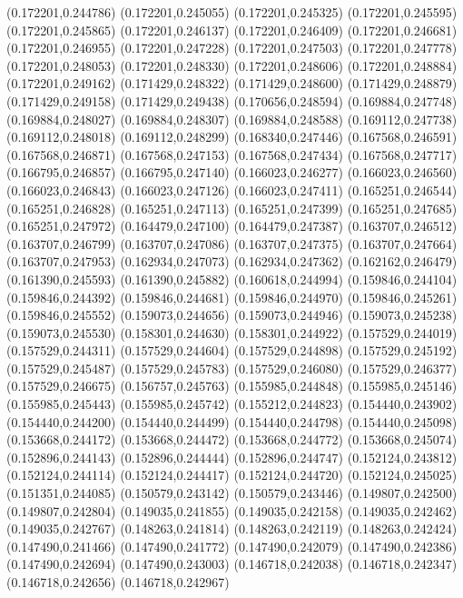 (0.172201,0.244786)
(0.172201,0.245055)
(0.172201,0.245325)
(0.172201,0.245595)
(0.172201,0.245865)
(0.172201,0.246137)
(0.172201,0.246409)
(0.172201,0.246681)
(0.172201,0.246955)
(0.172201,0.247228)
(0.172201,0.247503)
(0.172201,0.247778)
(0.172201,0.248053)
(0.172201,0.248330)
(0.172201,0.248606)
(0.172201,0.248884)
(0.172201,0.249162)
(0.171429,0.248322)
(0.171429,0.248600)
(0.171429,0.248879)
(0.171429,0.249158)
(0.171429,0.249438)
(0.170656,0.248594)
(0.169884,0.247748)
(0.169884,0.248027)
(0.169884,0.248307)
(0.169884,0.248588)
(0.169112,0.247738)
(0.169112,0.248018)
(0.169112,0.248299)
(0.168340,0.247446)
(0.167568,0.246591)
(0.167568,0.246871)
(0.167568,0.247153)
(0.167568,0.247434)
(0.167568,0.247717)
(0.166795,0.246857)
(0.166795,0.247140)
(0.166023,0.246277)
(0.166023,0.246560)
(0.166023,0.246843)
(0.166023,0.247126)
(0.166023,0.247411)
(0.165251,0.246544)
(0.165251,0.246828)
(0.165251,0.247113)
(0.165251,0.247399)
(0.165251,0.247685)
(0.165251,0.247972)
(0.164479,0.247100)
(0.164479,0.247387)
(0.163707,0.246512)
(0.163707,0.246799)
(0.163707,0.247086)
(0.163707,0.247375)
(0.163707,0.247664)
(0.163707,0.247953)
(0.162934,0.247073)
(0.162934,0.247362)
(0.162162,0.246479)
(0.161390,0.245593)
(0.161390,0.245882)
(0.160618,0.244994)
(0.159846,0.244104)
(0.159846,0.244392)
(0.159846,0.244681)
(0.159846,0.244970)
(0.159846,0.245261)
(0.159846,0.245552)
(0.159073,0.244656)
(0.159073,0.244946)
(0.159073,0.245238)
(0.159073,0.245530)
(0.158301,0.244630)
(0.158301,0.244922)
(0.157529,0.244019)
(0.157529,0.244311)
(0.157529,0.244604)
(0.157529,0.244898)
(0.157529,0.245192)
(0.157529,0.245487)
(0.157529,0.245783)
(0.157529,0.246080)
(0.157529,0.246377)
(0.157529,0.246675)
(0.156757,0.245763)
(0.155985,0.244848)
(0.155985,0.245146)
(0.155985,0.245443)
(0.155985,0.245742)
(0.155212,0.244823)
(0.154440,0.243902)
(0.154440,0.244200)
(0.154440,0.244499)
(0.154440,0.244798)
(0.154440,0.245098)
(0.153668,0.244172)
(0.153668,0.244472)
(0.153668,0.244772)
(0.153668,0.245074)
(0.152896,0.244143)
(0.152896,0.244444)
(0.152896,0.244747)
(0.152124,0.243812)
(0.152124,0.244114)
(0.152124,0.244417)
(0.152124,0.244720)
(0.152124,0.245025)
(0.151351,0.244085)
(0.150579,0.243142)
(0.150579,0.243446)
(0.149807,0.242500)
(0.149807,0.242804)
(0.149035,0.241855)
(0.149035,0.242158)
(0.149035,0.242462)
(0.149035,0.242767)
(0.148263,0.241814)
(0.148263,0.242119)
(0.148263,0.242424)
(0.147490,0.241466)
(0.147490,0.241772)
(0.147490,0.242079)
(0.147490,0.242386)
(0.147490,0.242694)
(0.147490,0.243003)
(0.146718,0.242038)
(0.146718,0.242347)
(0.146718,0.242656)
(0.146718,0.242967)
